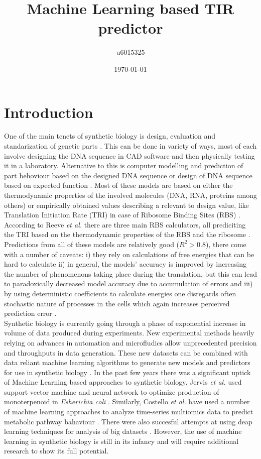 \documentclass{article}
\title{Machine Learning based TIR predictor}
\author{u6015325 }
\date{\today{}}
\begin{document}
\maketitle

\section{Introduction}

One of the main tenets of synthetic biology is design, evaluation and standarization of genetic parts \cite{Brophy2014,Canton2008,Stanton2014}. This can be done in variety of ways, most of each involve designing the DNA sequence in CAD software and then physically testing it in a laboratory. Alternative to this is computer modelling and prediction of part behoviour based on the designed DNA sequence or design of DNA sequence based on expected function \cite{Yeoh2019,Nielsen2016}. Most of these models are based on either the thermodynamic properties of the involved molecules (DNA, RNA, proteins among others) or empirically obtained values describing a relevant to design value, like Translation Initiation Rate (TRI) in case of Ribosome Binding Sites (RBS) \cite{Xia1998,Chen2013,Reeve2014}.\\
According to Reeve \emph{et al.} there are three main RBS calculators, all prediciting the TRI based on the thermodynamic properties of the RBS and the ribosome \cite{Seo2013,Na2010,Salis2009}. Predictions from all of these models are relatively good ($R^2 >0.8$), there come with a number of caveats: i) they rely on calculations of free energies that can be hard to calculate ii) in general, the models' accuracy is improved by increasing the number of phenomenons taking place during the translation, but this can lead to paradoxically decreased model accuracy due to accumulation of errors \cite{EspahBorujeni2016} and iii) by using deterministic coefficients to calculate energies one disregards often stochastic nature of processes in the cells which again increases perceived prediction error \cite{Goss1998}. \\
Synthetic biology is currently going through a phase of exponential increase in volume of data produced during experiments. \cite{Freemont2019} New experimental methods heavily relying on advances in automation and microfludics allow unprecedented precision and throughputs in data generation. These new datasets can be combined with data reliant machine learning algorithms to generate new models and predictors for use in synthetic biology \cite{Camacho2018}. In the past few years there was a significant uptick of Machine Learning based approaches to synthetic biology. Jervis \emph{et al.} used support vector machine and neural network to optimize production of monoterpenoid in \emph{Esherichia coli} \cite{Jervis2019}. Similarly, Costello \emph{et al.} have used a number of machine learning approaches to analyze time-series multiomics data to predict metabolic pathway bahaviour \cite{Costello2018}. There were also succesful attempts at using deap learning techniques for analysis of big datasets \cite{Alipanahi2015,Angermueller2016}. However, the use of machine learning in synthetic biology is still in its infancy and will require additional research to show its full potential. \\
\end{document}
